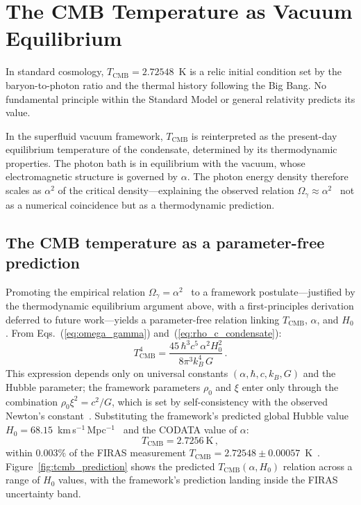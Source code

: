 \documentclass[12pt, a4paper]{article}
\newcommand{\Tcmb}{T_{\mathrm{CMB}}}
\begin{document}
\section{The CMB Temperature as Vacuum Equilibrium}
\label{sec:tcmb}

In standard cosmology, $\Tcmb = 2.72548$~K is a relic initial condition set by the baryon-to-photon ratio and the thermal history following the Big Bang. No fundamental principle within the Standard Model or general relativity predicts its value.

In the superfluid vacuum framework, $\Tcmb$ is reinterpreted as the present-day equilibrium temperature of the condensate, determined by its thermodynamic properties. The photon bath is in equilibrium with the vacuum, whose electromagnetic structure is governed by $\alpha$. The photon energy density therefore scales as $\alpha^2$ of the critical density---explaining the observed relation $\Omega_\gamma \approx \alpha^2$~\cite{kulangiev_2026o} not as a numerical coincidence but as a thermodynamic prediction.

\subsection{The CMB temperature as a parameter-free prediction}
\label{sec:tcmb_prediction}

Promoting the empirical relation $\Omega_\gamma = \alpha^2$~\cite{kulangiev_2026o} to a framework postulate---justified by the thermodynamic equilibrium argument above, with a first-principles derivation deferred to future work---yields a parameter-free relation linking $\Tcmb$, $\alpha$, and $H_0$. From Eqs.~(\ref{eq:omega_gamma}) and~(\ref{eq:rho_c_condensate}):
\begin{equation}
    \Tcmb^4 = \frac{45\,\hbar^3 c^5\,\alpha^2 H_0^2}{8\pi^3 k_B^4\,G}\,.
\label{eq:T_prediction}
\end{equation}
This expression depends only on universal constants $(\alpha, \hbar, c, k_B, G)$ and the Hubble parameter; the framework parameters $\rho_0$ and $\xi$ enter only through the combination $\rho_0\xi^2 = c^2/G$, which is set by self-consistency with the observed Newton's constant~\cite{kulangiev_2026e}. Substituting the framework's predicted global Hubble value $H_0 = 68.15$~km\,s$^{-1}$\,Mpc$^{-1}$~\cite{kulangiev_2026o} and the CODATA value of $\alpha$:
\begin{equation}
    \Tcmb = 2.7256~\mathrm{K}\,,
\label{eq:T_predicted_value}
\end{equation}
within $0.003\%$ of the FIRAS measurement $\Tcmb = 2.72548 \pm 0.00057$~K~\cite{fixsen_2009}. Figure~\ref{fig:tcmb_prediction} shows the predicted $\Tcmb(\alpha, H_0)$ relation across a range of $H_0$ values, with the framework's prediction landing inside the FIRAS uncertainty band.
\end{document}
